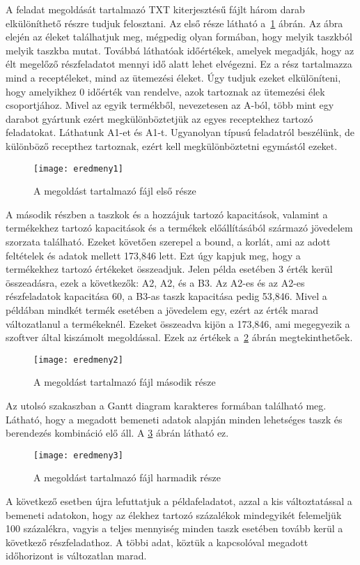 A feladat megoldását tartalmazó TXT kiterjesztésű fájlt három darab elkülöníthető részre tudjuk felosztani. Az első része látható a~\ref{eredmeny1} ábrán. Az ábra elején az éleket találhatjuk meg, mégpedig olyan formában, hogy melyik taszkból melyik taszkba mutat. Továbbá láthatóak időértékek, amelyek megadják, hogy az élt megelőző részfeladatot mennyi idő alatt lehet elvégezni. Ez a rész tartalmazza mind a receptéleket, mind az ütemezési éleket. Úgy tudjuk ezeket elkülöníteni, hogy amelyikhez 0 időérték van rendelve, azok tartoznak az ütemezési élek csoportjához. Mivel az egyik termékből, nevezetesen az A-ból, több mint egy darabot gyártunk ezért megkülönböztetjük az egyes receptekhez tartozó feladatokat. Láthatunk A1-et és A1-t. Ugyanolyan típusú feladatról beszélünk, de különböző recepthez tartoznak, ezért kell megkülönböztetni egymástól ezeket. 
\begin{figure}[H]
\begin{center}
\texttt{[image: eredmeny1]}
\caption{A megoldást tartalmazó fájl első része}
\label{eredmeny1}
\end{center}
\end{figure}
A második részben a taszkok és a hozzájuk tartozó kapacitások, valamint a termékekhez tartozó kapacitások és a termékek előállításából származó jövedelem szorzata található. Ezeket követően szerepel a bound, a korlát, ami az adott feltételek és adatok mellett 173,846 lett. Ezt úgy kapjuk meg, hogy a termékekhez tartozó értékeket összeadjuk. Jelen példa esetében 3 érték kerül összeadásra, ezek a következők: A2, A2, és a B3. Az A2-es és az A2-es részfeladatok kapacitása 60, a B3-as taszk kapacitása pedig 53,846. Mivel a példában mindkét termék esetében a jövedelem egy, ezért az érték marad változatlanul a termékeknél. Ezeket összeadva kijön a 173,846, ami megegyezik a szoftver által kiszámolt megoldással. Ezek az értékek a~\ref{eredmeny2} ábrán megtekinthetőek.
\begin{figure}[H]
\begin{center}
\texttt{[image: eredmeny2]}
\caption{A megoldást tartalmazó fájl második része}
\label{eredmeny2}
\end{center}
\end{figure}
Az utolsó szakaszban a Gantt diagram karakteres formában található meg. Látható, hogy a megadott bemeneti adatok alapján minden lehetséges taszk és berendezés kombináció elő áll. A \ref{eredmeny3} ábrán látható ez. 
\begin{figure}[H]
\begin{center}
\texttt{[image: eredmeny3]}
\caption{A megoldást tartalmazó fájl harmadik része}
\label{eredmeny3}
\end{center}
\end{figure}
A következő esetben újra lefuttatjuk a példafeladatot, azzal a kis változtatással a bemeneti adatokon, hogy az élekhez tartozó százalékok mindegyikét felemeljük 100 százalékra, vagyis a teljes mennyiség minden taszk esetében tovább kerül a következő részfeladathoz. A többi adat, köztük a kapcsolóval megadott időhorizont is változatlan marad. 

